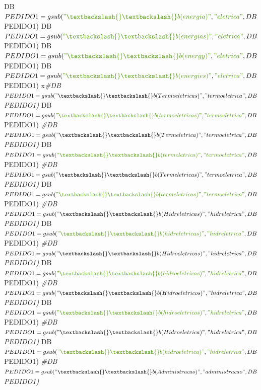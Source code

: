 \documentclass[]{article}
\newenvironment{Shaded}{\begin{snugshade}}{\end{snugshade}}
\newcommand{\CommentTok}[1]{\textcolor[rgb]{0.56,0.35,0.01}{\textit{#1}}}
\newcommand{\NormalTok}[1]{#1}
\newcommand{\StringTok}[1]{\textcolor[rgb]{0.31,0.60,0.02}{#1}}
\begin{document}
\begin{Shaded}
\begin{Highlighting}[]
\NormalTok{DB$PEDIDO1 =gsub(}\StringTok{"\textbackslash{}\textbackslash{}b(energia)"}\NormalTok{, }\StringTok{"eletrica"}\NormalTok{, DB$PEDIDO1)}
\NormalTok{DB$PEDIDO1 =gsub(}\StringTok{"\textbackslash{}\textbackslash{}b(energias)"}\NormalTok{, }\StringTok{"eletrica"}\NormalTok{, DB$PEDIDO1)}
\NormalTok{DB$PEDIDO1 =gsub(}\StringTok{"\textbackslash{}\textbackslash{}b(energy)"}\NormalTok{, }\StringTok{"eletrica"}\NormalTok{, DB$PEDIDO1)}
\NormalTok{DB$PEDIDO1 =gsub(}\StringTok{"\textbackslash{}\textbackslash{}b(energies)"}\NormalTok{, }\StringTok{"eletrica"}\NormalTok{, DB$PEDIDO1)}
\NormalTok{x}\CommentTok{#DB$PEDIDO1 =gsub("\textbackslash{}\textbackslash{}b(Termoeletricas)", "termoeletrica", DB$PEDIDO1)}
\NormalTok{DB$PEDIDO1 =gsub(}\StringTok{"\textbackslash{}\textbackslash{}b(termoeletricas)"}\NormalTok{, }\StringTok{"termoeletrica"}\NormalTok{, DB$PEDIDO1)}
\CommentTok{#DB$PEDIDO1 =gsub("\textbackslash{}\textbackslash{}b(Termeletrica)", "termoeletrica", DB$PEDIDO1)}
\NormalTok{DB$PEDIDO1 =gsub(}\StringTok{"\textbackslash{}\textbackslash{}b(termeletrica)"}\NormalTok{, }\StringTok{"termoeletrica"}\NormalTok{, DB$PEDIDO1)}
\CommentTok{#DB$PEDIDO1 =gsub("\textbackslash{}\textbackslash{}b(Termeletricas)", "termoeletrica", DB$PEDIDO1)}
\NormalTok{DB$PEDIDO1 =gsub(}\StringTok{"\textbackslash{}\textbackslash{}b(termeletricas)"}\NormalTok{, }\StringTok{"termoeletrica"}\NormalTok{, DB$PEDIDO1)}
\CommentTok{#DB$PEDIDO1 =gsub("\textbackslash{}\textbackslash{}b(Hidreletricas)", "hidreletrica", DB$PEDIDO1)}
\NormalTok{DB$PEDIDO1 =gsub(}\StringTok{"\textbackslash{}\textbackslash{}b(hidreletricas)"}\NormalTok{, }\StringTok{"hidreletrica"}\NormalTok{, DB$PEDIDO1)}
\CommentTok{#DB$PEDIDO1 =gsub("\textbackslash{}\textbackslash{}b(Hidroeletricas)", "hidreletrica", DB$PEDIDO1)}
\NormalTok{DB$PEDIDO1 =gsub(}\StringTok{"\textbackslash{}\textbackslash{}b(hidroeletricas)"}\NormalTok{, }\StringTok{"hidreletrica"}\NormalTok{, DB$PEDIDO1)}
\CommentTok{#DB$PEDIDO1 =gsub("\textbackslash{}\textbackslash{}b(Hidroeletricos)", "hidreletrica", DB$PEDIDO1)}
\NormalTok{DB$PEDIDO1 =gsub(}\StringTok{"\textbackslash{}\textbackslash{}b(hidroeletricos)"}\NormalTok{, }\StringTok{"hidreletrica"}\NormalTok{, DB$PEDIDO1)}
\CommentTok{#DB$PEDIDO1 =gsub("\textbackslash{}\textbackslash{}b(Hidroeletrica)", "hidreletrica", DB$PEDIDO1)}
\NormalTok{DB$PEDIDO1 =gsub(}\StringTok{"\textbackslash{}\textbackslash{}b(hidroeletrica)"}\NormalTok{, }\StringTok{"hidreletrica"}\NormalTok{, DB$PEDIDO1)}
\CommentTok{#DB$PEDIDO1 =gsub("\textbackslash{}\textbackslash{}b(Administracao)", "administracao", DB$PEDIDO1)}

\end{Highlighting}
\end{Shaded}
\end{document}
